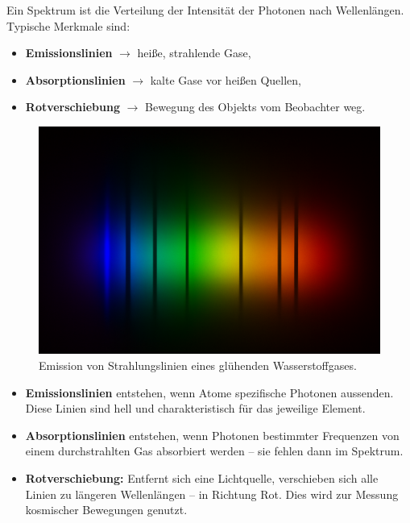 \begin{tcolorbox}[didaktikbox, title=Was zeigt ein Spektrum?]
	\label{box:was zeigt spektrum}
	\small
	Ein Spektrum ist die Verteilung der Intensität der Photonen nach Wellenlängen. Typische Merkmale sind:
	\begin{itemize}
		\item \textbf{Emissionslinien} $\rightarrow$ heiße, strahlende Gase,
		\item \textbf{Absorptionslinien} $\rightarrow$  kalte Gase vor heißen Quellen,
		\item \textbf{Rotverschiebung} $\rightarrow$  Bewegung des Objekts vom Beobachter weg.
	\end{itemize}
\end{tcolorbox}
\begin{figure}[H]
	\centering
	\includegraphics[width=0.9\linewidth]{bilder/emissionslinien.png}
	\caption{Emission von Strahlungslinien eines glühenden  Wasserstoffgases.}
	\label{fig:emission_hydrogen}
\end{figure}

\begin{tcolorbox}[physikbox, title=Spektrallinien und Rotverschiebung]
	\label{box:spektrallinien}
	\small
	\begin{itemize}
		\item \textbf{Emissionslinien} entstehen, wenn Atome spezifische Photonen aussenden. Diese Linien sind hell und charakteristisch für das jeweilige Element.
		\item \textbf{Absorptionslinien} entstehen, wenn Photonen bestimmter Frequenzen von einem durchstrahlten Gas absorbiert werden – sie fehlen dann im Spektrum.
		\item \textbf{Rotverschiebung:} Entfernt sich eine Lichtquelle, verschieben sich alle Linien zu längeren Wellenlängen – in Richtung Rot. Dies wird zur Messung kosmischer Bewegungen genutzt.
	\end{itemize}
\end{tcolorbox}

